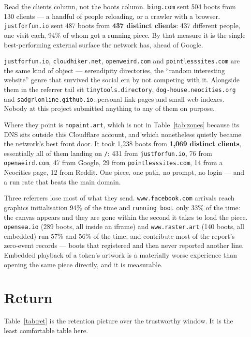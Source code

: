 \documentclass[10pt,letterpaper,twocolumn]{article}
\begin{document}
Read the clients column, not the boots column. \texttt{bing.com} sent
504 boots from 130 clients --- a handful of people reloading, or a
crawler with a browser. \texttt{justforfun.io} sent 487 boots from
\textbf{437 distinct clients}: 437 different people, one visit each,
94\% of whom got a running piece. By that measure it is the single
best-performing external surface the network has, ahead of Google.

\texttt{justforfun.io}, \texttt{cloudhiker.net},
\texttt{openweird.com} and \texttt{pointlesssites.com} are the same
kind of object --- serendipity directories, the ``random interesting
website'' genre that survived the social era by not competing with it.
Alongside them in the referrer tail sit
\texttt{tinytools.directory}, \texttt{dog-house.neocities.org} and
\texttt{sadgrlonline.github.io}: personal link pages and small-web
indexes. Nobody at this project submitted anything to any of them on
purpose.

Where they point is \texttt{nopaint.art}, which is not in
Table~\ref{tab:zones} because its DNS sits outside this Cloudflare
account, and which nonetheless quietly became the network's best
front door. It took 1,238 boots from \textbf{1,069 distinct clients},
essentially all of them landing on \texttt{/}: 431 from
\texttt{justforfun.io}, 76 from \texttt{openweird.com}, 47 from Google,
29 from \texttt{pointlesssites.com}, 14 from a Neocities page, 12 from
Reddit. One piece, one path, no prompt, no login --- and a run rate that
beats the main domain.

Three referrers lose most of what they send.
\texttt{www.facebook.com} arrivals reach graphics initialisation 94\%
of the time and \texttt{running boot} only 33\% of the time: the canvas
appears and they are gone within the second it takes to load the piece.
\texttt{opensea.io} (289 boots, all inside an iframe) and
\texttt{www.raster.art} (140 boots, all embedded) run 57\% and 56\% of
the time, and contribute most of the report's zero-event
records --- boots that registered and then never reported another line.
Embedded playback of a token's artwork is a materially worse experience
than opening the same piece directly, and it is measurable.

\section{Return}
\label{sec:return}

Table~\ref{tab:ret} is the retention picture over the trustworthy
window. It is the least comfortable table here.
\end{document}
